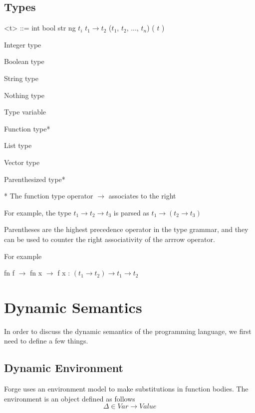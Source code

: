 \documentclass[titlepage]{article}
\begin{document}
\subsection{Types}
\begin{minipage}[t]{0.5\textwidth}
\begin{grammar}
<t> ::= int
\alt bool
\alt str
\alt ng
\alt $t_i$
\alt $t_1 \rightarrow t_2$
\alt ($t_1$, $t_2$, ..., $t_n$)
\alt ( $t$ )
\end{grammar}
\end{minipage}%
\begin{minipage}[t]{0.5\textwidth}
  Integer type

  Boolean type

  String type

  Nothing type

  Type variable

  Function type*

  List type

  Vector type

  Parenthesized type*
  \end{minipage}%

\vspace{0.25in}
* The function type operator $\rightarrow$ associates to the right

For example, the type $t_1 \rightarrow t_2 \rightarrow t_3$ is parsed as $t_1 \rightarrow (t_2 \rightarrow t_3)$

Parentheses are the highest precedence operator in the type grammar, and they can be used to counter the right associativity of the arrrow operator.

For example

\begin{center}

fn f $\rightarrow$ fn x $\rightarrow$ f x : $(t_1 \rightarrow t_2) \rightarrow t_1 \rightarrow t_2$

\end{center}



\newpage
\section{Dynamic Semantics}

In order to discuss the dynamic semantics of the programming language, we first need to
define a few things.


\subsection{Dynamic Environment}
Forge uses an environment model to make substitutions in function bodies. The environment is an object defined as follows
$$\Delta \in Var  \rightarrow Value$$
\end{document}
